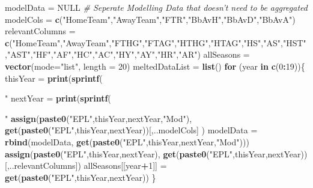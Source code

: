 \documentclass[
]{article}
\newenvironment{Shaded}{\begin{snugshade}}{\end{snugshade}}
\newcommand{\CommentTok}[1]{\textcolor[rgb]{0.56,0.35,0.01}{\textit{#1}}}
\newcommand{\ControlFlowTok}[1]{\textcolor[rgb]{0.13,0.29,0.53}{\textbf{#1}}}
\newcommand{\DataTypeTok}[1]{\textcolor[rgb]{0.13,0.29,0.53}{#1}}
\newcommand{\DecValTok}[1]{\textcolor[rgb]{0.00,0.00,0.81}{#1}}
\newcommand{\KeywordTok}[1]{\textcolor[rgb]{0.13,0.29,0.53}{\textbf{#1}}}
\newcommand{\NormalTok}[1]{#1}
\newcommand{\OperatorTok}[1]{\textcolor[rgb]{0.81,0.36,0.00}{\textbf{#1}}}
\newcommand{\OtherTok}[1]{\textcolor[rgb]{0.56,0.35,0.01}{#1}}
\newcommand{\StringTok}[1]{\textcolor[rgb]{0.31,0.60,0.02}{#1}}
\begin{document}
\begin{Shaded}
\begin{Highlighting}[]
{{\NormalTok{modelData =}\StringTok{ }\OtherTok{NULL}
\CommentTok{# Seperate Modelling Data that doesn't need to be aggregated}
\NormalTok{modelCols =}\StringTok{ }\KeywordTok{c}\NormalTok{(}\StringTok{"HomeTeam"}\NormalTok{,}\StringTok{"AwayTeam"}\NormalTok{,}\StringTok{"FTR"}\NormalTok{,}\StringTok{"BbAvH"}\NormalTok{,}\StringTok{"BbAvD"}\NormalTok{,}\StringTok{"BbAvA"}\NormalTok{)}
\NormalTok{relevantColumns =}\StringTok{ }\KeywordTok{c}\NormalTok{(}\StringTok{"HomeTeam"}\NormalTok{,}\StringTok{"AwayTeam"}\NormalTok{,}\StringTok{"FTHG"}\NormalTok{,}\StringTok{"FTAG"}\NormalTok{,}\StringTok{"HTHG"}\NormalTok{,}\StringTok{"HTAG"}\NormalTok{,}\StringTok{"HS"}\NormalTok{,}\StringTok{"AS"}\NormalTok{,}\StringTok{"HST"}\NormalTok{,}\StringTok{"AST"}\NormalTok{,}\StringTok{"HF"}\NormalTok{,}\StringTok{"AF"}\NormalTok{,}\StringTok{"HC"}\NormalTok{,}\StringTok{"AC"}\NormalTok{,}\StringTok{"HY"}\NormalTok{,}\StringTok{"AY"}\NormalTok{,}\StringTok{"HR"}\NormalTok{,}\StringTok{"AR"}\NormalTok{)}
\NormalTok{allSeasons =}\StringTok{ }\KeywordTok{vector}\NormalTok{(}\DataTypeTok{mode=}\StringTok{"list"}\NormalTok{, }\DataTypeTok{length =} \DecValTok{20}\NormalTok{)}
\NormalTok{meltedDataList =}\StringTok{ }\KeywordTok{list}\NormalTok{()}
\ControlFlowTok{for}\NormalTok{ (year }\ControlFlowTok{in} \KeywordTok{c}\NormalTok{(}\DecValTok{0}\OperatorTok{:}\DecValTok{19}\NormalTok{))\{}
\NormalTok{  thisYear =}\StringTok{ }\KeywordTok{print}\NormalTok{(}\KeywordTok{sprintf}\NormalTok{(}\StringTok{"%
\NormalTok{  nextYear =}\StringTok{ }\KeywordTok{print}\NormalTok{(}\KeywordTok{sprintf}\NormalTok{(}\StringTok{"%
  \KeywordTok{assign}\NormalTok{(}\KeywordTok{paste0}\NormalTok{(}\StringTok{"EPL"}\NormalTok{,thisYear,nextYear,}\StringTok{"Mod"}\NormalTok{), }\KeywordTok{get}\NormalTok{(}\KeywordTok{paste0}\NormalTok{(}\StringTok{"EPL"}\NormalTok{,thisYear,nextYear))[,..modelCols] )}
\NormalTok{  modelData =}\StringTok{ }\KeywordTok{rbind}\NormalTok{(modelData, }\KeywordTok{get}\NormalTok{(}\KeywordTok{paste0}\NormalTok{(}\StringTok{"EPL"}\NormalTok{,thisYear,nextYear,}\StringTok{"Mod"}\NormalTok{)))}
  \KeywordTok{assign}\NormalTok{(}\KeywordTok{paste0}\NormalTok{(}\StringTok{"EPL"}\NormalTok{,thisYear,nextYear), }\KeywordTok{get}\NormalTok{(}\KeywordTok{paste0}\NormalTok{(}\StringTok{"EPL"}\NormalTok{,thisYear,nextYear))[,..relevantColumns])}
\NormalTok{  allSeasons[[year}\OperatorTok{+}\DecValTok{1}\NormalTok{]] =}\StringTok{ }\KeywordTok{get}\NormalTok{(}\KeywordTok{paste0}\NormalTok{(}\StringTok{"EPL"}\NormalTok{,thisYear,nextYear))}
\NormalTok{\}}


}}}}
\end{Highlighting}
\end{Shaded}
\end{document}
